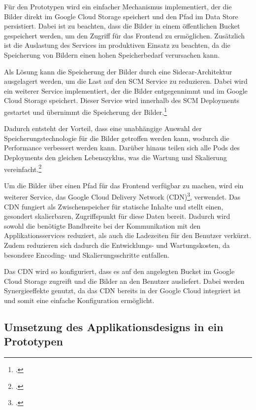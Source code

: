 Für den Prototypen wird ein einfacher Mechanismus implementiert, der die Bilder direkt im Google Cloud Storage speichert und den Pfad im Data Store persistiert.
Dabei ist zu beachten, dass die Bilder in einem öffentlichen Bucket gespeichert werden, um den Zugriff für das Frontend zu ermöglichen.
Zusätzlich ist die Auslastung des Services im produktiven Einsatz zu beachten, da die Speicherung von Bildern einen hohen Speicherbedarf verursachen kann.

Als Lösung kann die Speicherung der Bilder durch eine Sidecar-Architektur ausgelagert werden, um die Last auf den SCM Service zu reduzieren.
Dabei wird ein weiterer Service implementiert, der die Bilder entgegennimmt und im Google Cloud Storage speichert.
Dieser Service wird innerhalb des SCM Deployments gestartet und übernimmt die Speicherung der Bilder.\footcite{microsoft_sidecar_pattern}

Dadurch entsteht der Vorteil, dass eine unabhängige Auswahl der Speicherungstechnologie für die Bilder getroffen werden kann, wodurch die Performance verbessert werden kann.
Darüber hinaus teilen sich alle Pods des Deployments den gleichen Lebenszyklus, was die Wartung und Skalierung vereinfacht.\footcite{kubernetes_sidecar_containers}

Um die Bilder über einen Pfad für das Frontend verfügbar zu machen, wird ein weiterer Service, das Google Cloud Delivery Network (CDN)\footcite{google_cloud_cdn_overview}, verwendet.
Das CDN fungiert als Zwischenspeicher für statische Inhalte und stellt einen, gesondert skalierbaren, Zugriffspunkt für diese Daten bereit.
Dadurch wird sowohl die benötigte Bandbreite bei der Kommunikation mit den Applikationsservices reduziert, als auch die Ladezeiten für den Benutzer verkürzt.
Zudem reduzieren sich dadurch die Entwicklungs- und Wartungskosten, da besondere Encoding- und Skalierungsschritte entfallen.

Das CDN wird so konfiguriert, dass es auf den angelegten Bucket im Google Cloud Storage zugreift und die Bilder an den Benutzer ausliefert.
Dabei werden Synergieeffekte genutzt, da das CDN bereits in der Google Cloud integriert ist und somit eine einfache Konfiguration ermöglicht.

\subsection{Umsetzung des Applikationsdesigns in ein Prototypen}\label{subsec:umsetzung-des-applikationsdesigns-in-ein-prototypen}

